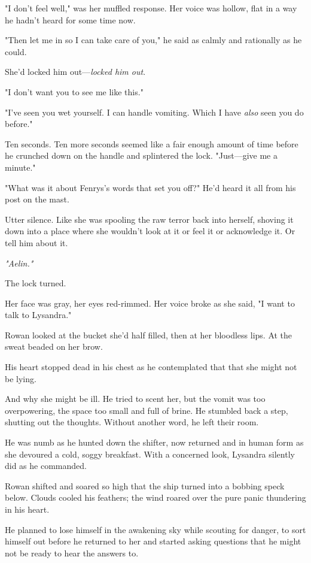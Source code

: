 "I don't feel well," was her muffled response.
Her voice was hollow, flat in a way he hadn't heard for some time now.

"Then let me in so I can take care of you," he said as calmly and rationally as he could.

She'd locked him out---\emph{locked him out}.

"I don't want you to see me like this."

"I've seen you wet yourself.
I can handle vomiting.
Which I have \emph{also} seen you do before."

Ten seconds.
Ten more seconds seemed like a fair enough amount of time before he crunched down on the handle and splintered the lock.
"Just---give me a minute."

"What was it about Fenrys's words that set you off?"
He'd heard it all from his post on the mast.

Utter silence.
Like she was spooling the raw terror back into herself, shoving it down into a place where she wouldn't look at it or feel it or acknowledge it.
Or tell him about it.

\emph{"Aelin."}

The lock turned.

Her face was gray, her eyes red-rimmed.
Her voice broke as she said, "I want to talk to Lysandra."

Rowan looked at the bucket she'd half filled, then at her bloodless lips.
At the sweat beaded on her brow.

His heart stopped dead in his chest as he contemplated that 
that she might not be lying.

And why she might be ill.
He tried to scent her, but the vomit was too overpowering, the space too small and full of brine.
He stumbled back a step, shutting out the thoughts.
Without another word, he left their room.

He was numb as he hunted down the shifter, now returned and in human form as she devoured a cold, soggy breakfast.
With a concerned look, Lysandra silently did as he commanded.

Rowan shifted and soared so high that the ship turned into a bobbing speck below.
Clouds cooled his feathers; the wind roared over the pure panic thundering in his heart.

He planned to lose himself in the awakening sky while scouting for danger, to sort himself out before he returned to her and started asking questions that he might not be ready to hear the answers to.


